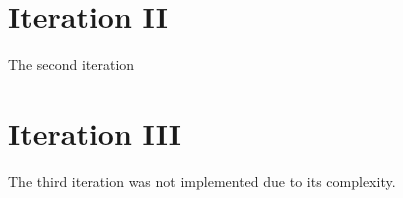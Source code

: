 \section{Iteration II}
The second iteration 

\section{Iteration III}
The third iteration was not implemented due to its complexity.

